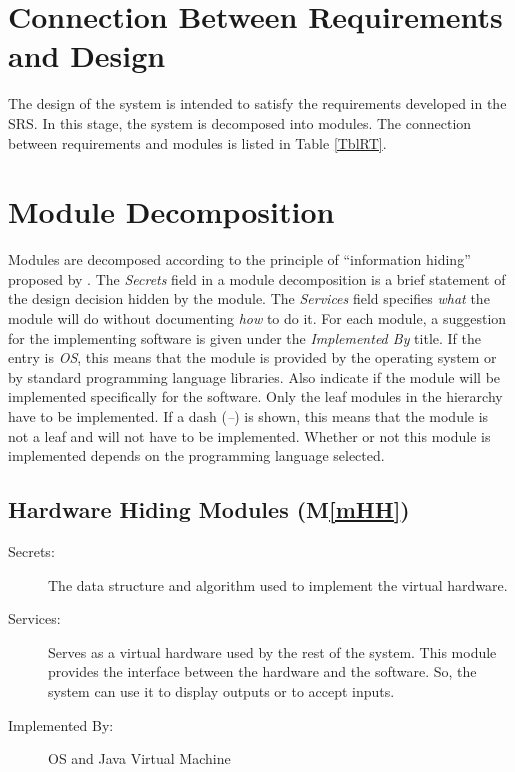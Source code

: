 \documentclass[12pt, titlepage]{article}
\newcommand{\mref}[1]{M\ref{#1}}
\begin{document}
\section{Connection Between Requirements and Design} \label{SecConnection}
The design of the system is intended to satisfy the requirements developed in
the SRS. In this stage, the system is decomposed into modules. The connection
between requirements and modules is listed in Table \ref{TblRT}.

\section{Module Decomposition} \label{SecMD}
Modules are decomposed according to the principle of ``information hiding''
proposed by \citet{ParnasEtAl1984}. The \emph{Secrets} field in a module
decomposition is a brief statement of the design decision hidden by the
module. The \emph{Services} field specifies \emph{what} the module will do
without documenting \emph{how} to do it. For each module, a suggestion for the
implementing software is given under the \emph{Implemented By} title. If the
entry is \emph{OS}, this means that the module is provided by the operating
system or by standard programming language libraries.  Also indicate if the
module will be implemented specifically for the software.
Only the leaf modules in the hierarchy have to be implemented.
If a dash (\emph{--}) is shown, this means that the module is not a leaf and
will not have to be implemented. Whether or not this module is implemented
depends on the programming language selected.

\subsection{Hardware Hiding Modules (\mref{mHH})}
\begin{description}
\item[Secrets:]The data structure and algorithm used to implement the virtual
  hardware.
\item[Services:]Serves as a virtual hardware used by the rest of the
  system. This module provides the interface between the hardware and the
  software. So, the system can use it to display outputs or to accept inputs.
\item[Implemented By:] OS and Java Virtual Machine
\end{description}
\end{document}
